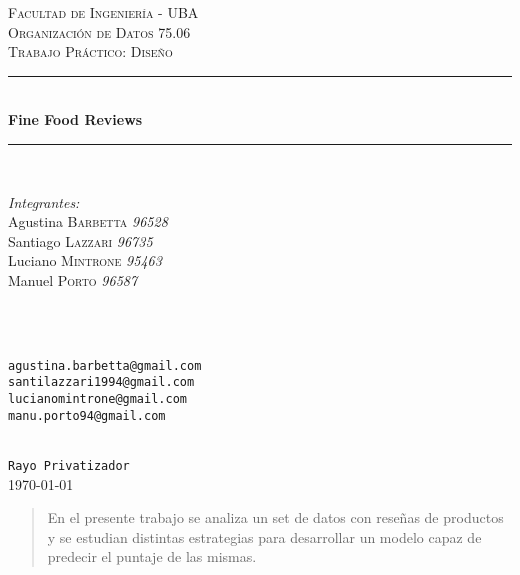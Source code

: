 \documentclass[10pt,a4paper]{article}
\begin{document}
\begin{titlepage}

\newcommand{\HRule}{\rule{\linewidth}{0.5mm}} %

\center %

\textsc{\LARGE Facultad de Ingeniería - UBA}\\[1.5cm]
\textsc{\Large Organización de Datos 75.06}\\[0.5cm]
\textsc{\large Trabajo Práctico: Diseño}\\[0.5cm]

\HRule \\[0.4cm]
{ \huge \bfseries Fine Food Reviews}\\[0.4cm]
\HRule \\[1.5cm]

\begin{minipage}{0.5\textwidth}
\begin{flushleft} \large
\emph{Integrantes:}\\
Agustina \textsc{Barbetta} \textit{96528}\\
Santiago \textsc{Lazzari} \textit{96735}\\
Luciano \textsc{Mintrone} \textit{95463}\\
Manuel \textsc{Porto} \textit{96587}\\
\end{flushleft}
\end{minipage}
~
\begin{minipage}{0.4\textwidth}
\begin{flushright} \large
\emph{ }\\
\texttt{agustina.barbetta@gmail.com}\\
\texttt{santilazzari1994@gmail.com}\\
\texttt{lucianomintrone@gmail.com}\\
\texttt{manu.porto94@gmail.com}\\
\end{flushright}
\end{minipage}\\[2cm]

{\Large \texttt{Rayo Privatizador}}\\[2cm]

{\large \today}\\[3cm]

\begin{abstract}
En el presente trabajo se analiza un set de datos con reseñas de productos y se estudian distintas estrategias para desarrollar un modelo capaz de predecir el puntaje de las mismas.
\end{abstract}


\vfill %

\end{titlepage}
\end{document}
